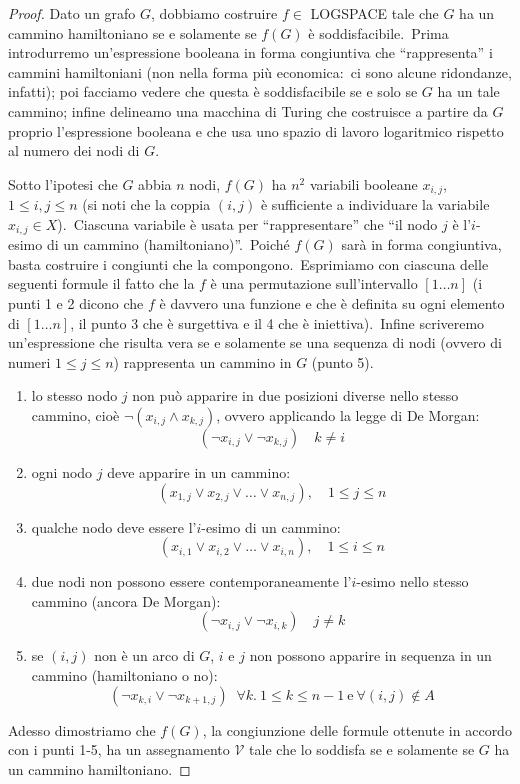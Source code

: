 \begin{proof}

    Dato un grafo $G$, dobbiamo costruire $f \in$ LOGSPACE tale che $G$ ha un cammino hamiltoniano se e solamente se $f(G)$ è soddisfacibile.\
    Prima introdurremo un'espressione booleana in forma congiuntiva che ``rappresenta'' i cammini hamiltoniani (non nella forma più economica:\ ci sono alcune ridondanze, infatti); poi facciamo vedere che questa è soddisfacibile se e solo se $G$ ha un tale cammino; infine delineamo una macchina di Turing che costruisce a partire da $G$ proprio l'espressione booleana e che usa uno spazio di lavoro logaritmico rispetto al numero dei nodi di $G$.\
    \medskip

    \noindent Sotto l'ipotesi che $G$ abbia $n$ nodi, $f(G)$ ha $n^2$ variabili booleane $x_{i,j}$, $1 \leq i, j \leq n$ (si noti che la coppia $(i, j)$ è sufficiente a individuare la variabile $x_{i,j} \in X$).\
    Ciascuna variabile è usata per ``rappresentare'' che ``il nodo $j$ è l'$i$-esimo di un cammino (hamiltoniano)''.\
    Poiché $f(G)$ sarà in forma congiuntiva, basta costruire i congiunti che la compongono.\
    Esprimiamo con ciascuna delle seguenti formule il fatto che la $f$ è una permutazione sull'intervallo $[1 \dots n]$ (i punti 1 e 2 dicono che $f$ è davvero una funzione e che è definita su ogni elemento di $[1 \dots n]$, il punto 3 che è surgettiva e il 4 che è iniettiva).\
    Infine scriveremo un'espressione che risulta vera se e solamente se una sequenza di nodi (ovvero di numeri $1 \leq j \leq n$) rappresenta un cammino in $G$ (punto 5).

    \begin{enumerate}
        \itemsep 0px
        \item lo stesso nodo $j$ non può apparire in due posizioni diverse nello stesso cammino, cioè $\neg (x_{i,j} \land x_{k,j})$, ovvero applicando la legge di De Morgan: \[(\neg x_{i,j} \lor \neg x_{k,j})\quad  k \neq i\]
        \item ogni nodo $j$ deve apparire in un cammino: \[(x_{1,j} \lor x_{2,j} \lor \dots \lor x_{n,j}), \quad 1 \leq j \leq n\]
        \item qualche nodo deve essere l'$i$-esimo di un cammino: \[(x_{i,1} \lor x_{i,2} \lor \dots \lor x_{i,n}),\quad 1 \leq i \leq n\]
        \item due nodi non possono essere contemporaneamente l'$i$-esimo nello stesso cammino (ancora De Morgan): \[(\neg x_{i,j} \lor \neg x_{i,k})\quad j \neq k\]
        \item se $(i, j)$ non è un arco di $G$, $i$ e $j$ non possono apparire in sequenza in un cammino (hamiltoniano o no): \[(\neg x_{k,i} \lor \neg x_{k+1,j}) \; \; \forall k.\ 1 \leq k \leq n-1\ \mathrm{e}\ \forall(i,j) \not \in A\]
    \end{enumerate}
    Adesso dimostriamo che $f(G)$, la congiunzione delle formule ottenute in accordo con i punti 1-5, ha un assegnamento $\mathcal{V}$ tale che lo soddisfa se e solamente se $G$ ha un cammino hamiltoniano.


\end{proof}
